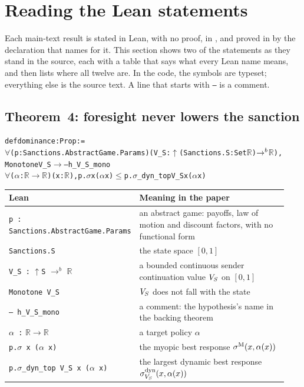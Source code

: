 \section{Reading the Lean statements}
\label{app:reading-lean}

Each main-text result is stated in Lean, with no proof, in
, and proved in 
by the declaration that  names for it. This section shows two of
the statements as they stand in the source, each with a table that says what every Lean
name means, and then lists where all twelve are. In the code, the symbols are typeset;
everything else is the source text. A line that starts with \texttt{--} is a comment.

\subsection{Theorem~4: foresight never lowers the sanction}
\label{app:reading-lean:dominance}

\begin{alltt}\footnotesize
def dominance : Prop :=
  \(\forall\) (p : Sanctions.AbstractGame.Params) (V_S : \(\uparrow\)(Sanctions.S : Set \(\mathbb{R}\)) \(\to\sp{b}\) \(\mathbb{R}\)),
    Monotone V_S \(\to\)  -- h_V_S_mono
    \(\forall\) (\(\alpha\) : \(\mathbb{R}\) \(\to\) \(\mathbb{R}\)) (x : \(\mathbb{R}\)), p.\(\sigma\) x (\(\alpha\) x) \(\le\) p.\(\sigma\)_dyn_top V_S x (\(\alpha\) x)
\end{alltt}

\begin{center}\footnotesize
\begin{tabular}{@{}p{0.36\linewidth}p{0.58\linewidth}@{}}
\toprule
Lean & Meaning in the paper \\
\midrule
\texttt{p : Sanctions.AbstractGame.Params} & an abstract game: payoffs, law of motion and
  discount factors, with no functional form \\
\texttt{Sanctions.S} & the state space $[0,1]$ \\
\texttt{V\_S :} \(\uparrow\)\texttt{S} \(\to^{b}\) \(\mathbb{R}\) & a bounded continuous sender continuation
  value $V_S$ on $[0,1]$ \\
\texttt{Monotone V\_S} & $V_S$ does not fall with the state \\
\texttt{-- h\_V\_S\_mono} & a comment: the hypothesis's name in the backing theorem \\
\(\alpha\)\texttt{ :} \(\mathbb{R}\to\mathbb{R}\) & a target policy $\alpha$ \\
\texttt{p.}\(\sigma\)\texttt{ x (}\(\alpha\)\texttt{ x)} & the myopic best response $\sigma^{\mathrm{M}}(x,\alpha(x))$ \\
\texttt{p.}\(\sigma\)\texttt{\_dyn\_top V\_S x (}\(\alpha\)\texttt{ x)} & the largest dynamic best response
  $\sigma^{\mathrm{dyn}}_{V_S}(x,\alpha(x))$ \\
\bottomrule
\end{tabular}
\end{center}

